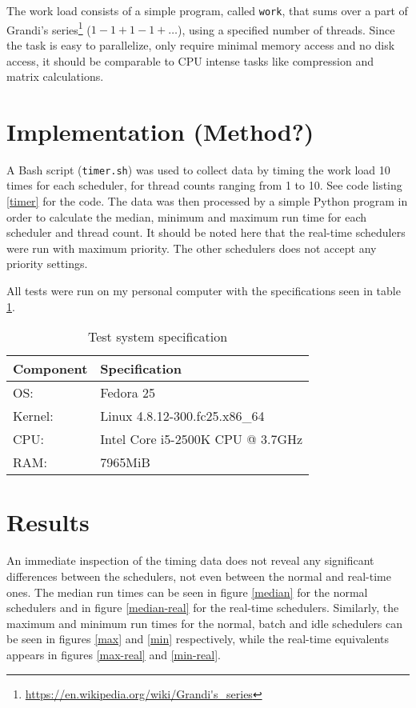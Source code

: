 \documentclass[12pt, a4paper]{article} %
\begin{document}
The work load consists of a simple program, called \texttt{work}, that sums over a part of Grandi's series\footnote{\url{https://en.wikipedia.org/wiki/Grandi's_series}} ($1-1+1-1+\dots$), using a specified number of threads.
Since the task is easy to parallelize, only require minimal memory access and no disk access, it should be comparable to CPU intense tasks like compression and matrix calculations.

\section{Implementation (Method?)}

A Bash script (\texttt{timer.sh}) was used to collect data by timing the work load 10 times for each scheduler, for thread counts ranging from 1 to 10.
See code listing \ref{timer} for the code.
The data was then processed by a simple Python program in order to calculate the median, minimum and maximum run time for each scheduler and thread count.
It should be noted here that the real-time schedulers were run with maximum priority.
The other schedulers does not accept any priority settings.

All tests were run on my personal computer with the specifications seen in table \ref{spec}.


\begin{table}[h]
	\centering
	\begin{tabular}{ll}
		Component & Specification \\
		\hline
		OS: & Fedora 25 \\
		Kernel: & Linux 4.8.12-300.fc25.x86\_64 \\
		CPU: & Intel Core i5-2500K CPU @ 3.7GHz \\
		RAM: & 7965MiB
	\end{tabular}
	\caption{Test system specification}
	\label{spec}
\end{table}



\section{Results}

An immediate inspection of the timing data does not reveal any significant differences between the schedulers, not even between the normal and real-time ones.
The median run times can be seen in figure \ref{median} for the normal schedulers and in figure \ref{median-real} for the real-time schedulers.
Similarly, the maximum and minimum run times for the normal, batch and idle schedulers can be seen in figures \ref{max} and \ref{min} respectively, while the real-time equivalents appears in figures \ref{max-real} and \ref{min-real}.
\end{document}
